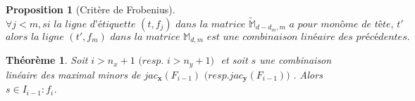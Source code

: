\documentclass[french]{article}
\newtheorem{proposition}{Proposition}[section]
\newtheorem{theoreme}{Théorème}[section]
\newcommand{\propositionTitre}[2]{
	\begin{proposition}[#1]
		#2
	\end{proposition}
}
\begin{document}
\propositionTitre{Critère de Frobenius}{
$$\forall j < m, \textit{si la ligne d'étiquette }(t,f_j) \textit{ dans la matrice } 
\tilde{\mathbb{M}}_{d-d_m, m} \textit{ a pour monôme de tête, } t'$$
$$	\textit{alors la ligne } 
(t', f_m) \textit{ dans la matrice } \mathbb{M}_{d, m} \textit{ est une combinaison linéaire des précédentes.}$$
}

\begin{theoreme}
Soit $i > n_x + 1 \textit{ (resp. } i > n_y + 1\textit{) }$ et soit $s$ une 
combinaison linéaire des maximal minors de $jac_\textbf{x}(F_{i-1}) 
\textit{ (resp.} jac_\textbf{y}(F_{i-1}) \textit{) }$. Alors $s \in I_{i-1}:f_i$.
\end{theoreme}
\end{document}

